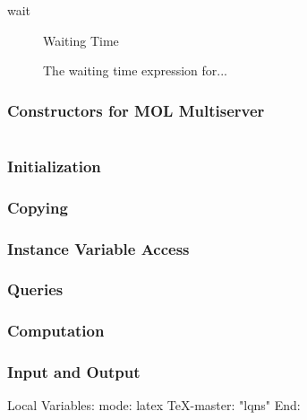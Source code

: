 \begin{description}
\item[wait] \texonly{---} Waiting Time\\

  The waiting time expression for...

\end{description}

\subsubsection{Constructors for MOL Multiserver}

\begin{verbatim}

\end{verbatim}

\subsubsection{Initialization}
\subsubsection{Copying}
\subsubsection{Instance Variable Access}
\subsubsection{Queries}
\subsubsection{Computation}
\subsubsection{Input and Output}


\C Local Variables: 
\C mode: latex
\C TeX-master: "lqns"
\C End: 
